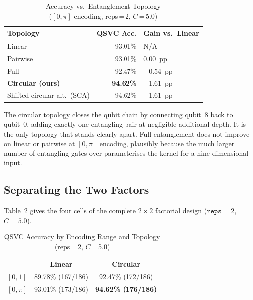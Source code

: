 \documentclass[10pt,conference]{IEEEtran}
\begin{document}
\begin{table}[t]
\caption{Accuracy vs.\ Entanglement Topology\\
          ($[0,\pi]$ encoding, reps\,=\,2, $C$\,=\,5.0)}
\label{tab:topology}
\centering
\renewcommand{\arraystretch}{1.1}
\begin{tabular}{lrl}
\toprule
Topology & QSVC Acc. & Gain vs.\ Linear\\
\midrule
Linear                        & 93.01\% & N/A\\
Pairwise                      & 93.01\% & 0.00~pp\\
Full                          & 92.47\% & $-$0.54~pp\\
\textbf{Circular (ours)}      & \textbf{94.62\%} & $+$1.61~pp\\
Shifted-circular-alt.\ (SCA)  & 94.62\% & $+$1.61~pp\\
\bottomrule
\end{tabular}
\end{table}

The circular topology closes the qubit chain by connecting qubit~8 back
to qubit~0, adding exactly one entangling pair at negligible additional
depth. It is the only topology that stands clearly apart. Full
entanglement does not improve on linear or pairwise at $[0,\pi]$
encoding, plausibly because the much larger number of entangling gates
over-parameterises the kernel for a nine-dimensional input.

\subsection{Separating the Two Factors}

Table~\ref{tab:factorial} gives the four cells of the complete
$2\!\times\!2$ factorial design ($\texttt{reps}\!=\!2$, $C\!=\!5.0$).

\begin{table}[t]
\caption{QSVC Accuracy by Encoding Range and Topology\\
         (reps\,=\,2, $C$\,=\,5.0)}
\label{tab:factorial}
\centering
\renewcommand{\arraystretch}{1.3}
\begin{tabular}{lcc}
\toprule
 & Linear & Circular\\
\midrule
$[0,1]$ & 89.78\% (167/186) & 92.47\% (172/186)\\
$[0,\pi]$ & 93.01\% (173/186) & \textbf{94.62\% (176/186)}\\
\bottomrule
\end{tabular}
\end{table}
\end{document}
